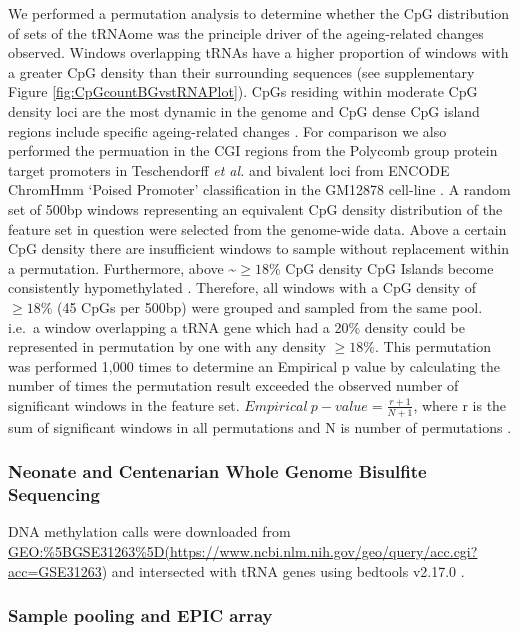 \documentclass[]{book}
\begin{document}
We performed a permutation analysis to determine whether the CpG distribution of sets of the tRNAome was the principle driver of the ageing-related changes observed.
Windows overlapping tRNAs have a higher proportion of windows with a greater CpG density than their surrounding sequences (see supplementary Figure \ref{fig:CpGcountBGvstRNAPlot}).
CpGs residing within moderate CpG density loci are the most dynamic in the genome \citep{Ziller2013} and CpG dense CpG island regions include specific ageing-related changes \citep{Teschendorff2010, Rakyan2010, Bell2016}.
For comparison we also performed the permuation in the CGI regions from the Polycomb group protein target promoters in Teschendorff \emph{et al.} \citep{Teschendorff2010} and bivalent loci from ENCODE ChromHmm `Poised Promoter' classification in the GM12878 cell-line \citep{Ernst2011}.
A random set of 500bp windows representing an equivalent CpG density distribution of the feature set in question were selected from the genome-wide data.
Above a certain CpG density there are insufficient windows to sample without replacement within a permutation.
Furthermore, above \textasciitilde{}\(\ge18\%\) CpG density CpG Islands become consistently hypomethylated \citep{Bell2012a}.
Therefore, all windows with a CpG density of \(\ge18\%\) (45 CpGs per 500bp) were grouped and sampled from the same pool.
i.e.~a window overlapping a tRNA gene which had a 20\% density could be represented in permutation by one with any density \(\ge18\%\).
This permutation was performed 1,000 times to determine an Empirical p value by calculating the number of times the permutation result exceeded the observed number of significant windows in the feature set.
\(Empirical~p-value = \frac{r+1}{N+1}\), where r is the sum of significant windows in all permutations and N is number of permutations \citep{North2003}.

\hypertarget{neonate-and-centenarian-whole-genome-bisulfite-sequencing}{%
\subsubsection{Neonate and Centenarian Whole Genome Bisulfite Sequencing}\label{neonate-and-centenarian-whole-genome-bisulfite-sequencing}}

DNA methylation calls were downloaded from \url{GEO:\%5BGSE31263\%5D(https://www.ncbi.nlm.nih.gov/geo/query/acc.cgi?acc=GSE31263}) and intersected with tRNA genes using bedtools v2.17.0 \citep{Quinlan2010}.

\hypertarget{sample-pooling-and-epic-array}{%
\subsubsection{Sample pooling and EPIC array}\label{sample-pooling-and-epic-array}}
\end{document}
